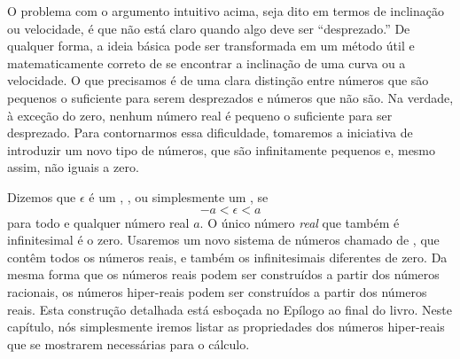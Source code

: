 O problema com o argumento intuitivo acima, seja dito em termos de
inclinação ou velocidade, é que não está claro quando algo deve ser
``desprezado.'' De qualquer forma, a ideia básica pode ser transformada
em um método útil e matematicamente correto de se encontrar a
inclinação de uma curva ou a velocidade. O que precisamos é de uma
clara distinção entre números que são pequenos o suficiente para serem
desprezados e números que não são. Na verdade, à exceção do zero, nenhum
número real é pequeno o suficiente para ser desprezado. Para contornarmos
essa dificuldade, tomaremos a iniciativa de introduzir um novo tipo de
números, que são infinitamente pequenos e, mesmo assim, não iguais a zero.

Dizemos que $\epsilon$ é um , ,
ou simplesmente um , se
\[
  -a < \epsilon < a
\]
para todo e qualquer número real $a$. O único número \emph{real} que
também é infinitesimal é o zero. Usaremos um novo sistema de números
chamado de , que contêm todos os números
reais, e também os infinitesimais diferentes de zero. Da mesma forma
que os números reais podem ser construídos a partir dos números
racionais, os números hiper-reais podem ser construídos a partir dos
números reais. Esta construção detalhada está esboçada no Epílogo ao
final do livro. Neste capítulo, nós simplesmente iremos listar as
propriedades dos números hiper-reais que se mostrarem necessárias para
o cálculo.


